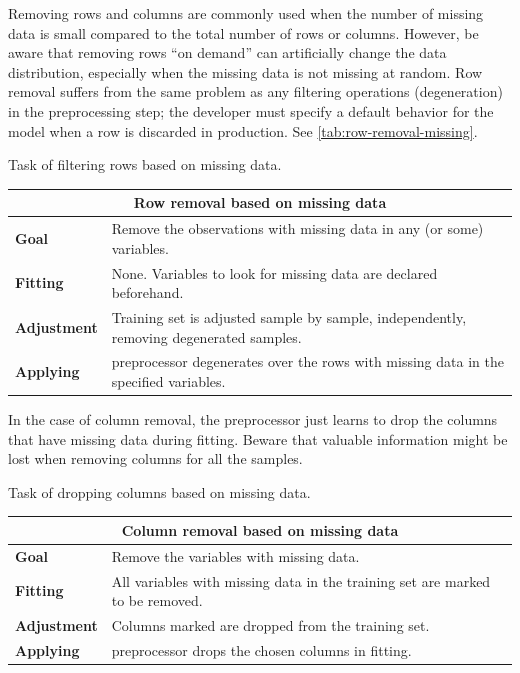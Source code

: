 Removing rows and columns are commonly used when the number of missing data is small
compared to the total number of rows or columns.  However, be aware that removing rows
``on demand'' can
artificially change the data distribution, especially when the missing data is not missing at
random.  Row removal suffers from the same problem as any filtering operations
(degeneration) in the preprocessing step; the developer must specify a default behavior
for the model when a row is discarded in production.  See \cref{tab:row-removal-missing}.

\begin{tablebox}[label=tab:row-removal-missing]{Task of filtering rows based on missing data.}
  \centering
  \begin{tabular}{lp{6cm}}
    \toprule
    \multicolumn{2}{c}{\textbf{Row removal based on missing data}} \\
    \midrule
    \textbf{Goal} &
      Remove the observations with missing data in any (or some) variables. \\
    \textbf{Fitting} &
      None. Variables to look for missing data are declared beforehand. \\
    \textbf{Adjustment} &
      Training set is adjusted sample by sample, independently, removing
      degenerated samples. \\
    \textbf{Applying} &
      \Gls{preprocessor} degenerates over the rows with missing data in the specified variables.
      \\
    \bottomrule
  \end{tabular}
\end{tablebox}

In the case of column removal, the
\gls{preprocessor} just learns to drop the columns that have missing data during fitting.
Beware that valuable information might be lost when removing columns for all the samples.

\begin{tablebox}[label=tab:col-drop-missing]{Task of dropping columns based on missing data.}
  \centering
  \begin{tabular}{lp{6cm}}
    \toprule
    \multicolumn{2}{c}{\textbf{Column removal based on missing data}} \\
    \midrule
    \textbf{Goal} &
      Remove the variables with missing data. \\
    \textbf{Fitting} &
      All variables with missing data in the training set are marked to be removed. \\
    \textbf{Adjustment} &
      Columns marked are dropped from the training set. \\
    \textbf{Applying} &
      \Gls{preprocessor} drops the chosen columns in fitting. \\
    \bottomrule
  \end{tabular}
\end{tablebox}

